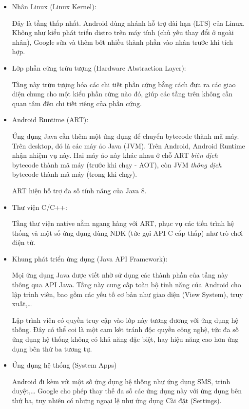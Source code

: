 \documentclass[../../thesis]{subfiles}
\begin{document}
\begin{itemize}
    \item
        Nhân Linux (Linux Kernel):

        Đây là tầng thấp nhất. Android dùng nhánh hỗ trợ dài hạn (LTS) của
        Linux. Không như kiểu phát triển distro trên máy tính (chủ yếu thay đổi
        ở ngoài nhân), Google sửa và thêm bớt nhiều thành phần vào nhân trước
        khi tích hợp.
    \item
        Lớp phần cứng trừu tượng (Hardware Abstraction Layer):

        Tầng này trừu tượng hóa các chi tiết phần cứng bằng cách đưa ra các giao
        diện chung cho một kiểu phần cứng nào đó, giúp các tầng trên không cần
        quan tâm đến chi tiết riêng của phần cứng.

    \item
        Android Runtime (ART):

        Ứng dụng Java cần thêm một ứng dụng để chuyển bytecode thành mã máy.
        Trên desktop, đó là các máy ảo Java (JVM). Trên Android, Android Runtime
        nhận nhiệm vụ này. Hai máy ảo này khác nhau ở chỗ ART \emph{biên dịch}
        bytecode thành mã máy (trước khi chạy - AOT), còn JVM \emph{thông dịch}
        bytecode thành mã máy (trong khi chạy).

        ART hiện hỗ trợ đa số tính năng của Java 8.
\end{itemize}

\begin{itemize}[resume, before = \vspace*{-\dimexpr\topsep+\partopsep\relax}]
    \item
        Thư viện C/C++:

        Tầng thư viện native nằm ngang hàng với ART, phục vụ các tiến trình hệ
        thống và một số ứng dụng dùng NDK (tức gọi API C cấp thấp) như trò chơi
        điện tử.
    \item
        Khung phát triển ứng dụng (Java API Framework):

        Mọi ứng dụng Java được viết nhờ sử dụng các thành phần của tầng này
        thông qua API Java. Tầng này cung cấp toàn bộ tính năng của Android cho
        lập trình viên, bao gồm các yếu tố cơ bản như giao diện (View System),
        truy xuất,\ldots

        Lập trình viên có quyền truy cập vào lớp này tương đương với ứng dụng hệ
        thống. Đây có thể coi là một cam kết tránh độc quyền công nghệ, tức đa
        số ứng dụng hệ thống không có khả năng đặc biệt, hay hiệu năng cao hơn
        ứng dụng bên thứ ba tương tự.
    \item
        Ứng dụng hệ thống (System Apps)

        Android đi kèm với một số ứng dụng hệ thống như ứng dụng SMS, trình
        duyệt,\ldots{} Google cho phép thay thế đa số các ứng dụng này với ứng
        dụng bên thứ ba, tuy nhiên có những ngoại lệ như ứng dụng Cài đặt
        (Settings).
\end{itemize}
\end{document}
